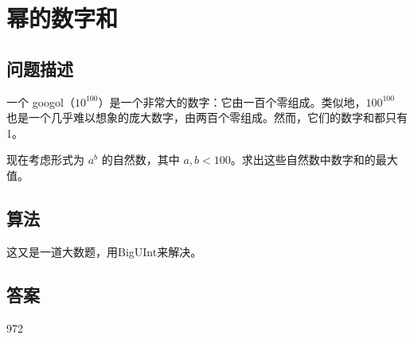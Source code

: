 \section{幂的数字和}
\subsection{问题描述}
\begin{tcolorbox}
一个 googol（$10^{100}$）是一个非常大的数字：它由一百个零组成。类似地，$100^{100}$ 也是一个几乎难以想象的庞大数字，由两百个零组成。然而，它们的数字和都只有 1。

现在考虑形式为 $a^b$ 的自然数，其中 $a, b < 100$。求出这些自然数中数字和的最大值。
\end{tcolorbox}

\subsection{算法}
这又是一道大数题，用BigUInt来解决。

\subsection{答案}
972
